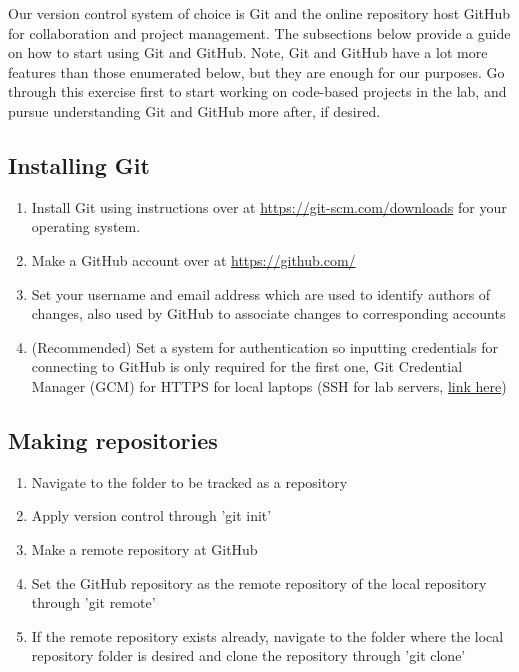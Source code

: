 \documentclass[11pt]{article}
\begin{document}
Our version control system of choice is Git and the online repository host GitHub for collaboration and project management. The subsections below provide a guide on how to start using Git and GitHub. Note, Git and GitHub have a lot more features than those enumerated below, but they are enough for our purposes. Go through this exercise first to start working on code-based projects in the lab, and pursue understanding Git and GitHub more after, if desired.

\subsection{Installing Git}
\begin{enumerate}
  \item Install Git using instructions over at \href{https://git-scm.com/downloads}{https://git-scm.com/downloads} for your operating system.
  \item Make a GitHub account over at \href{https://github.com/}{https://github.com/}
  \item Set your username and email address which are used to identify authors of changes, also used by GitHub to associate changes to corresponding accounts
  \item (Recommended) Set a system for authentication so inputting credentials for connecting to GitHub is only required for the first one, Git Credential Manager (GCM) for HTTPS for local laptops (SSH for lab servers, \href{https://docs.github.com/en/authentication/connecting-to-github-with-ssh/about-ssh}{link here})
\end{enumerate}

\subsection{Making repositories}
\begin{enumerate}
  \item Navigate to the folder to be tracked as a repository
  \item Apply version control through 'git init'
  \item Make a remote repository at GitHub
  \item Set the GitHub repository as the remote repository of the local repository through 'git remote'
  \item If the remote repository exists already, navigate to the folder where the local repository folder is desired and clone the repository through 'git clone'
\end{enumerate}
\end{document}
